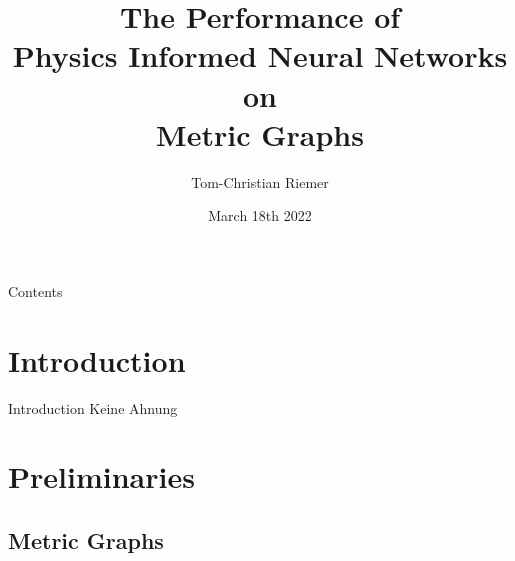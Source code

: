 \documentclass[9pt]{beamer}
\title{The Performance of \\ Physics Informed Neural Networks on \\ Metric Graphs}
\author{Tom-Christian Riemer}
\institute{TU Chemnitz}
\date{March 18th 2022}
\begin{document}
\maketitle

\begin{frame}{Contents}
  \tableofcontents
\end{frame}

\section{Introduction}

\begin{frame}{Introduction}
    Keine Ahnung
\end{frame}

\section{Preliminaries}

\subsection{Metric Graphs}
\end{document}

